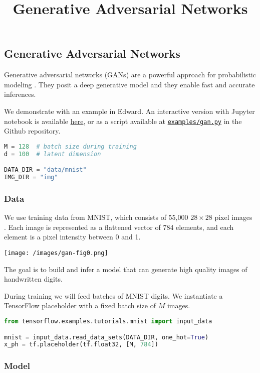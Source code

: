 \title{Generative Adversarial Networks}

\subsection{Generative Adversarial Networks}

Generative adversarial networks (GANs) are a powerful approach for
probabilistic modeling \citep{goodfellow2014generative,goodfellow2016nips}.
They posit a deep generative model and they enable fast and accurate
inferences.

We demonstrate with an example in Edward.
An interactive version with Jupyter notebook is available
\href{http://nbviewer.jupyter.org/github/blei-lab/edward/blob/master/docs/notebooks/gan.ipynb}{here},
or as a script available at
\href{https://github.com/blei-lab/edward/blob/master/examples/gan.py}
{\texttt{examples/gan.py}} in the Github repository.

\begin{lstlisting}[language=Python]
M = 128  # batch size during training
d = 100  # latent dimension

DATA_DIR = "data/mnist"
IMG_DIR = "img"
\end{lstlisting}

\subsubsection{Data}

We use training data from MNIST, which consists of 55,000 $28\times
28$ pixel images \citep{lecun1998gradient}. Each image is represented
as a flattened vector of 784 elements, and each element is a pixel
intensity between 0 and 1.

\texttt{[image: /images/gan-fig0.png]}

The goal is to build and infer a model that can generate high quality
images of handwritten digits.

During training we will feed batches of MNIST digits. We instantiate a
TensorFlow placeholder with a fixed batch size of $M$ images.

\begin{lstlisting}[language=Python]
from tensorflow.examples.tutorials.mnist import input_data

mnist = input_data.read_data_sets(DATA_DIR, one_hot=True)
x_ph = tf.placeholder(tf.float32, [M, 784])
\end{lstlisting}


\subsubsection{Model}

